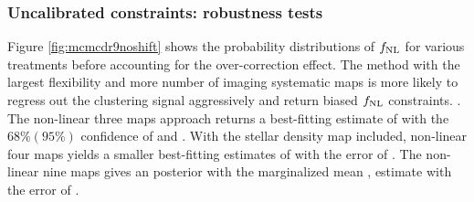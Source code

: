 \subsubsection{Uncalibrated constraints: robustness tests}
Figure \ref{fig:mcmcdr9noshift} shows the probability distributions of $f_{\rm NL}$ for various treatments before accounting for the over-correction effect. The method with the largest flexibility and more number of imaging systematic maps is more likely to regress out the clustering signal aggressively and return biased $f_{\rm NL}$ constraints. . The non-linear three maps approach returns a best-fitting estimate of  with the $68\%(95\%)$ confidence of  and . With the stellar density map included, non-linear four maps yields a smaller best-fitting estimates of  with the error of . The non-linear nine maps gives an  posterior with the marginalized mean ,  estimate  with the error of . 

